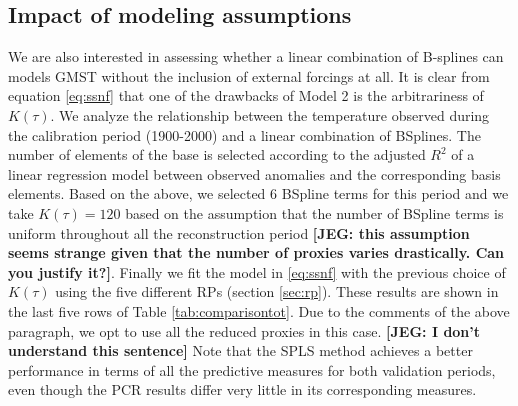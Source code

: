\documentclass[11pt]{amsart}
\theoremstyle{plain}
\theoremstyle{definition}
\theoremstyle{remark}
\newcommand{\jeg}[1]{\color{ProcessBlue}\textbf{[JEG: #1]}\normalcolor}
\begin{document}
\subsection{Impact of modeling assumptions}
We are also interested in assessing whether a linear combination of B-splines can models GMST without the inclusion of external
forcings at all. It is clear from equation \eqref{eq:ssnf} that one of the drawbacks of Model 2 is the arbitrariness of $K(\tau)$. We analyze the
relationship between the temperature observed during the calibration period
(1900-2000) and a linear combination of BSplines. The number of elements of the
base is selected according to the adjusted $R^2$ of a linear regression model between observed anomalies and
the corresponding basis elements. Based on the above, we selected 6
BSpline terms for this period and we take $K(\tau)=120$ based on the
assumption that the number of BSpline terms is uniform
throughout all the reconstruction period \jeg{this assumption seems strange given that the number of proxies varies drastically. Can you justify it?}. Finally we fit the model in
\eqref{eq:ssnf} with the previous choice of $K(\tau)$ using the five different RPs (section \ref{sec:rp}). These results are
shown in the last five rows of Table \ref{tab:comparisontot}. Due to the comments of the above paragraph, we opt to
use all the reduced proxies in this case. \jeg{I don't understand this sentence}
Note that the SPLS method achieves a better performance in terms of all the
predictive measures for both validation periods, even though the PCR results
differ very little in its corresponding measures. 
\end{document}
